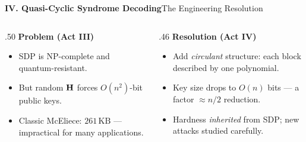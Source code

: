\begin{frame}{\textbf{IV. Quasi-Cyclic Syndrome Decoding}}{The Engineering Resolution}
\small
\begin{columns}[T,onlytextwidth]
\begin{column}{.50\textwidth}
\textcolor{TealDarkCyan}{\textbf{Problem (Act III)}}
\begin{itemize}
  \item SDP is NP-complete and quantum-resistant.
  \item But random $\mathbf{H}$ forces $O(n^2)$-bit public keys.
  \item Classic McEliece: $261\,\text{KB}$ — impractical for many applications.
\end{itemize}
\end{column}
\begin{column}{.46\textwidth}
\textcolor{TealDarkCyan}{\textbf{Resolution (Act IV)}}
\begin{itemize}
  \item Add \emph{circulant} structure: each block described by one polynomial.
  \item Key size drops to $O(n)$ bits — a factor $\approx n/2$ reduction.
  \item Hardness \emph{inherited} from SDP; new attacks studied carefully.
\end{itemize}
\end{column}
\end{columns}
\bigskip
\begin{center}
\end{center}
\end{frame}

